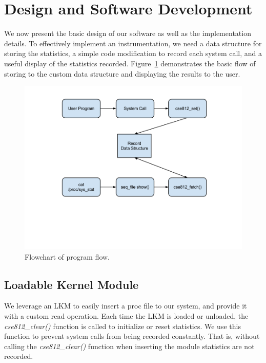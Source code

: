 \documentclass[conference]{IEEEtran}
\begin{document}
\section{Design and Software Development}
\label{sec:design}
We now present the basic design of our software as well as the implementation details.
To effectively implement an instrumentation, we need a data structure for storing the statistics, a simple code modification to record each system call, and a useful display of the statistics recorded.
Figure~\ref{fig:figure} demonstrates the basic flow of storing to the custom data structure and displaying the results to the user.

\begin{figure}[t!]
  \begin{center}
    \includegraphics[trim=120 230 90 50, clip, width=1.0\linewidth]{figure.png}
    \vspace{-0.18in}
  \end{center}
  \caption{Flowchart of program flow.}
  \label{fig:figure}
\end{figure}

\subsection{Loadable Kernel Module}
We leverage an LKM to easily insert a proc file to our system, and provide it with a custom read operation.
Each time the LKM is loaded or unloaded, the \textit{cse812\_clear()} function is called to initialize or reset statistics.
We use this function to prevent system calls from being recorded constantly.
That is, without calling the \textit{cse812\_clear()} function when inserting the module statistics are not recorded.
\end{document}
